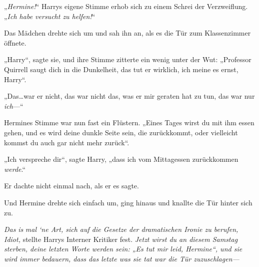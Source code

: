 „\emph{Hermine!}“ Harrys eigene Stimme erhob sich zu einem Schrei der Verzweiflung. „\emph{Ich habe versucht zu helfen!}“

Das Mädchen drehte sich um und sah ihn an, als es die Tür zum Klassenzimmer öffnete.

„Harry“, sagte sie, und ihre Stimme zitterte ein wenig unter der Wut: „Professor Quirrell saugt dich in die Dunkelheit, das tut er wirklich, ich meine es ernst, Harry“.

„Das…war er nicht, das war nicht das, was er mir geraten hat zu tun, das war nur \emph{ich}—“

Hermines Stimme war nun fast ein Flüstern. „Eines Tages wirst du mit ihm essen gehen, und es wird deine dunkle Seite sein, die zurückkommt, oder vielleicht kommst du auch gar nicht mehr zurück“.

„Ich verspreche dir“, sagte Harry, „dass ich vom Mittagessen zurückkommen \emph{werde}.“

Er dachte nicht einmal nach, als er es sagte.

Und Hermine drehte sich einfach um, ging hinaus und knallte die Tür hinter sich zu.

\emph{Das} \emph{is} \emph{mal `ne Art, sich auf die Gesetze der dramatischen Ironie zu berufen, Idiot,} stellte Harrys Interner Kritiker fest. \emph{Jetzt wirst du an diesem Samstag sterben, deine letzten Worte werden sein: „Es tut mir leid, Hermine“, und sie wird immer bedauern, dass das letzte was sie tat war die Tür zuzuschlagen—}

